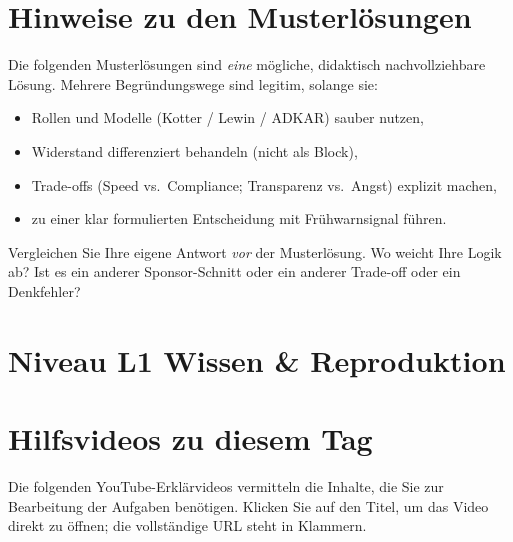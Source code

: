 \documentclass[11pt,a4paper,oneside]{article}
\begin{document}
\section*{Hinweise zu den Musterl\"osungen}
\thispagestyle{plain}

\noindent Die folgenden Musterl\"osungen sind \emph{eine} m\"ogliche, didaktisch nachvollziehbare L\"osung. Mehrere Begr\"undungswege sind legitim, solange sie:

\begin{itemize}
  \item Rollen und Modelle (Kotter / Lewin / ADKAR) sauber nutzen,
  \item Widerstand differenziert behandeln (nicht als Block),
  \item Trade-offs (Speed vs.\ Compliance; Transparenz vs.\ Angst) explizit machen,
  \item zu einer klar formulierten Entscheidung mit Fr\"uhwarnsignal f\"uhren.
\end{itemize}

\begin{infobox}
Vergleichen Sie Ihre eigene Antwort \emph{vor} der Musterl\"osung. Wo weicht Ihre Logik ab? Ist es ein anderer Sponsor-Schnitt oder ein anderer Trade-off \textendash{} oder ein Denkfehler?
\end{infobox}

\clearpage

\section*{Niveau L1 \textendash{} Wissen \& Reproduktion}

\section*{Hilfsvideos zu diesem Tag}
\thispagestyle{plain}

\noindent Die folgenden YouTube-Erkl\"arvideos vermitteln die Inhalte, die Sie zur Bearbeitung der Aufgaben ben\"otigen. Klicken Sie auf den Titel, um das Video direkt zu \"offnen; die vollst\"andige URL steht in Klammern.
\end{document}
